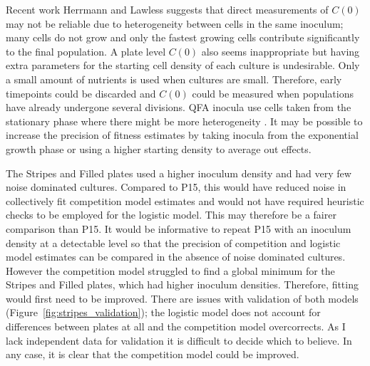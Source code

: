 Recent work Herrmann and Lawless suggests that direct measurements of
\(C(0)\) may not be reliable due to heterogeneity between cells in the
same inoculum; many cells do not grow and only the fastest growing
cells contribute significantly to the final population. A plate level
\(C(0)\) also seems inappropriate but having extra parameters for the
starting cell density of each culture is undesirable. Only a small
amount of nutrients is used when cultures are small. Therefore, early
timepoints could be discarded and \(C(0)\) could be measured when
populations have already undergone several divisions. QFA inocula use
cells taken from the stationary phase where there might be more
heterogeneity \citep{bergkessel2016}. It may be possible to increase
the precision of fitness estimates by taking inocula from the
exponential growth phase or using a higher starting density to average
out effects.

The Stripes and Filled plates used a higher inoculum density and had
very few noise dominated cultures. Compared to P15, this would have
reduced noise in collectively fit competition model estimates and
would not have required heuristic checks to be employed for the
logistic model. This may therefore be a fairer comparison than P15. It
would be informative to repeat P15 with an inoculum density at a
detectable level so that the precision of competition and logistic
model estimates can be compared in the absence of noise dominated
cultures. However the competition model struggled to find a global
minimum for the Stripes and Filled plates, which had higher inoculum
densities. Therefore, fitting would first need to be improved.
There are issues with validation of both models
(Figure~\ref{fig:stripes_validation}); the logistic model does not
account for differences between plates at all and the competition
model overcorrects. As I lack independent data for validation it is
difficult to decide which to believe.
In any case, it is clear that the competition model could be improved.



